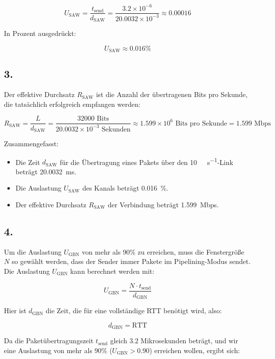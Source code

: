 \documentclass[a4paper]{scrartcl}
\begin{document}
\[
U_{\text{SAW}} = \frac{t_{\text{send}}}{d_{\text{SAW}}} = \frac{3.2 \times 10^{-6}}{20.0032 \times 10^{-3}} \approx 0.00016
\]

In Prozent ausgedrückt:

\[
U_{\text{SAW}} \approx 0.016 \%
\]

\subsection*{3.}

Der effektive Durchsatz \( R_{\text{SAW}} \) ist die Anzahl der übertragenen Bits pro Sekunde, die tatsächlich erfolgreich empfangen werden:

\[
R_{\text{SAW}} = \frac{L}{d_{\text{SAW}}} = \frac{32000 \text{ Bits}}{20.0032 \times 10^{-3} \text{ Sekunden}} \approx 1.599 \times 10^6 \text{ Bits pro Sekunde} = 1.599 \text{ Mbps}
\]

Zusammengefasst:

\begin{itemize}
    \item Die Zeit \( d_{\text{SAW}} \) für die Übertragung eines Pakets über den \SI{10}{\giga\bit\per\second}-Link beträgt \SI{20.0032}{\milli\second}.
    \item Die Auslastung \( U_{\text{SAW}} \) des Kanals beträgt \SI{0.016}{\%}.
    \item Der effektive Durchsatz \( R_{\text{SAW}} \) der Verbindung beträgt \SI{1.599}{Mbps}.
\end{itemize}
\subsection*{4.}

Um die Auslastung \( U_{\text{GBN}} \) von mehr als 90\% zu erreichen, muss die Fenstergröße \( N \) so gewählt werden, dass der Sender immer Pakete im Pipelining-Modus sendet. Die Auslastung \( U_{\text{GBN}} \) kann berechnet werden mit:

\[
U_{\text{GBN}} = \frac{N \cdot t_{\text{send}}}{d_{\text{GBN}}}
\]

Hier ist \( d_{\text{GBN}} \) die Zeit, die für eine vollständige RTT benötigt wird, also:

\[
d_{\text{GBN}} = \text{RTT}
\]

Da die Paketübertragungszeit \( t_{\text{send}} \) gleich \( 3.2 \) Mikrosekunden beträgt, und wir eine Auslastung von mehr als 90\% (\( U_{\text{GBN}} > 0.90 \)) erreichen wollen, ergibt sich:
\end{document}
